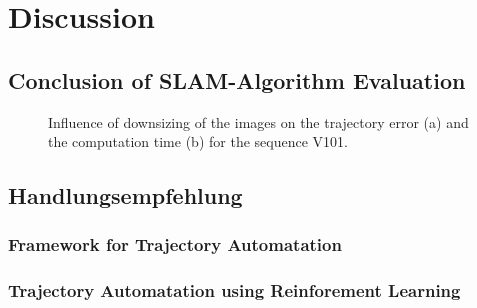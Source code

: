 \chapter{Discussion}

\section{Conclusion of SLAM-Algorithm Evaluation}



	\begin{figure}%
    \centering
	\qquad
    \caption{
	Influence of downsizing of the images on the trajectory error (a) and the computation time (b) for the sequence V101. 
	}%
    \label{fig:resolution}%
	\end{figure}

\section{Handlungsempfehlung}


\subsection{Framework for Trajectory Automatation}

\subsection{Trajectory Automatation using Reinforement Learning}

